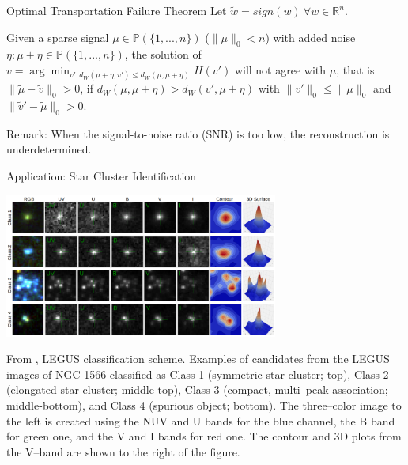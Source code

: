 \documentclass[10pt]{beamer}
\newcommand{\R}{{\mathbb{R}}}
\newcommand{\PP}{{\mathbb{P}}}
\newcommand{\1}{{\mathbbm{1}}}
\begin{document}
\begin{frame}{Optimal Transportation Failure Theorem}
    Let $\tilde w = sign(w) \ \forall w\in\R^n$. \pause
    \begin{theorem}
    Given a sparse signal $\mu\in\PP(\{1,...,n\})$ ($\|\mu\|_0<n$) with added noise $\eta : \mu + \eta \in \PP(\{1,...,n\})$, \pause the solution of $ v=\arg\min_{v' : d_W(\mu+\eta,v') \le d_W(\mu,\mu+\eta)} H(v')$ will not agree with $\mu$, that is $\|\tilde\mu - \tilde v\|_0>0$, if \pause $d_W(\mu,\mu+\eta) > d_W(v',\mu+\eta)$ with $\|v'\|_0 \le \|\mu\|_0$ and $\|\tilde v'-\tilde\mu\|_0 > 0$.
    \end{theorem} \pause
    Remark: When the signal-to-noise ratio (SNR) is too low, the reconstruction is underdetermined. 
\end{frame}

\begin{frame}{Application: Star Cluster Identification}
\begin{center}
     \pause
\includegraphics[width=9cm]{img/starcnet1.png} \pause

From \cite{perez_starcnet_2021}, LEGUS classification scheme. Examples of candidates from the LEGUS images of NGC 1566 classified as
Class 1 (symmetric star cluster; top), \pause Class 2 (elongated star cluster; middle-top), \pause Class 3 (compact, multi–peak association;
middle-bottom), and \pause Class 4 (spurious object; bottom). \pause The three–color image to the left is created using the NUV and U bands for the blue channel, the B band for green one, and the V and I bands for red one. The contour and 3D plots from the V–band are shown to the right of the figure.

\end{center}

\end{frame}
\end{document}

